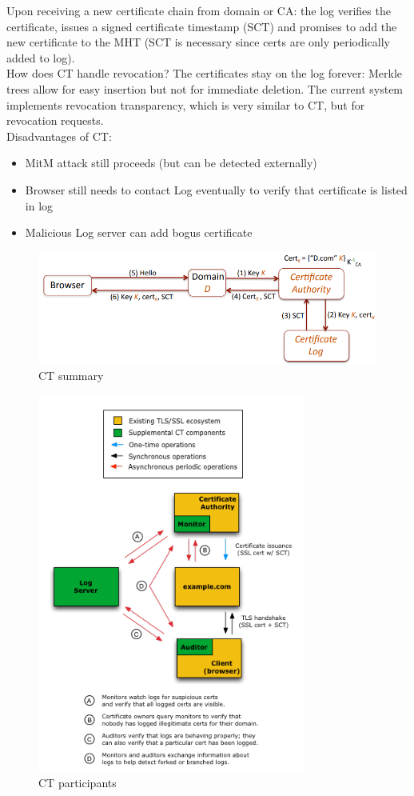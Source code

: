 \documentclass[11pt,oneside,a4paper]{article}
\begin{document}
\newpage

\noindent Upon receiving a new certificate chain from domain or CA: the log verifies the certificate, issues a signed certificate timestamp (SCT) and promises to add the new certificate to the MHT (SCT is necessary since certs are only periodically added to log).\\
How does CT handle revocation? The certificates stay on the log forever: Merkle trees allow for easy insertion but not for immediate deletion. The current system implements revocation transparency, which is very similar to CT, but for revocation requests.\\

\noindent Disadvantages of CT:

\vspace{-\topsep}
\begin{itemize}
	\setlength{\itemsep}{0pt}
	\setlength{\parskip}{0pt}
	\item MitM attack still proceeds (but can be detected externally)
	\item Browser still needs to contact Log eventually to verify that certificate is listed in log
	\item Malicious Log server can add bogus certificate
\end{itemize}
\vspace{-\topsep}

\begin{figure}[hb]
	\centering
	\includegraphics[width=0.6\linewidth]{figures/ct_summary}
	\caption{CT summary}
	\label{fig:ctsummary}
\end{figure}

\begin{figure}[hb]
	\centering
	\includegraphics[width=0.5\linewidth]{figures/ct_participants}
	\caption{CT participants}
	\label{fig:ctparticipants}
\end{figure}











\label{lastpage} %
\clearpage
{}



\clearpage
\appendix
{}
\end{document}
